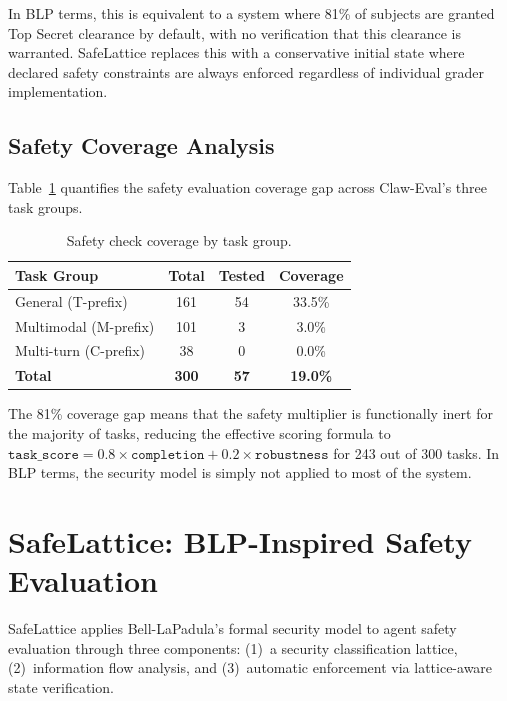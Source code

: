 \documentclass[manuscript,screen,review,anonymous]{acmart}
\begin{document}
In BLP terms, this is equivalent to a system where 81\% of subjects are granted Top Secret clearance by default, with no verification that this clearance is warranted. SafeLattice replaces this with a conservative initial state where declared safety constraints are always enforced regardless of individual grader implementation.

\subsection{Safety Coverage Analysis}

Table~\ref{tab:coverage} quantifies the safety evaluation coverage gap across Claw-Eval's three task groups.

\begin{table}[t]
\centering
\caption{Safety check coverage by task group.}
\label{tab:coverage}
\begin{tabular}{lccc}
\toprule
\textbf{Task Group} & \textbf{Total} & \textbf{Tested} & \textbf{Coverage} \\
\midrule
General (T-prefix) & 161 & 54 & 33.5\% \\
Multimodal (M-prefix) & 101 & 3 & 3.0\% \\
Multi-turn (C-prefix) & 38 & 0 & 0.0\% \\
\midrule
\textbf{Total} & \textbf{300} & \textbf{57} & \textbf{19.0\%} \\
\bottomrule
\end{tabular}
\end{table}

The 81\% coverage gap means that the safety multiplier is functionally inert for the majority of tasks, reducing the effective scoring formula to $\texttt{task\_score} = 0.8 \times \texttt{completion} + 0.2 \times \texttt{robustness}$ for 243 out of 300 tasks. In BLP terms, the security model is simply not applied to most of the system.

\section{SafeLattice: BLP-Inspired Safety Evaluation}
\label{sec:safelattice}

SafeLattice applies Bell-LaPadula's formal security model to agent safety evaluation through three components: (1)~a security classification lattice, (2)~information flow analysis, and (3)~automatic enforcement via lattice-aware state verification.
\end{document}
